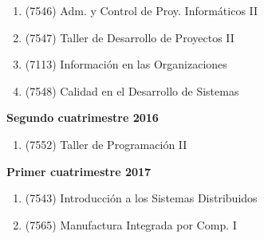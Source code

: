 \documentclass[a4paper,11pt]{article}
\begin{document}
\begin{enumerate}
  \item (7546) Adm. y Control de Proy. Informáticos II
  \item (7547) Taller de Desarrollo de Proyectos II
  \item (7113) Información en las Organizaciones
  \item (7548) Calidad en el Desarrollo de Sistemas
\end{enumerate}

\textbf{Segundo cuatrimestre 2016}

\begin{enumerate}
  \item (7552) Taller de Programación II
\end{enumerate}

\textbf{Primer cuatrimestre 2017}

\begin{enumerate}
  \item (7543) Introducción a los Sistemas Distribuidos
  \item (7565) Manufactura Integrada por Comp. I
\end{enumerate}
\end{document}
